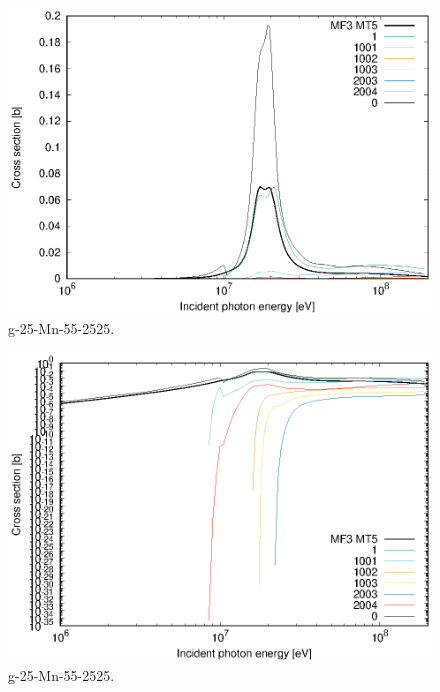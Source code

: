 \begin{figure}
 \includegraphics[width=\linewidth]{eps/g_25-Mn-55_2525.eps}
  \caption{g-25-Mn-55-2525.}
\end{figure}
\begin{figure}
 \includegraphics[width=\linewidth]{eps-log/g_25-Mn-55_2525.eps}
 \caption{g-25-Mn-55-2525.}
\end{figure}
\newpage \clearpage

